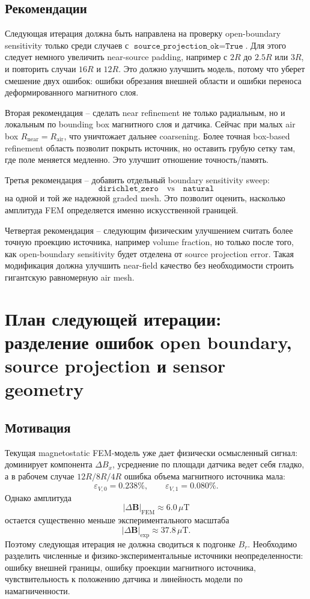 \documentclass[12pt,a4paper]{article}
\begin{document}
\subsection*{Рекомендации}

Следующая итерация должна быть направлена на проверку open-boundary sensitivity
только среди случаев с \(\texttt{source\_projection\_ok}=\texttt{True}\). Для
этого следует немного увеличить near-source padding, например с \(2R\) до
\(2.5R\) или \(3R\), и повторить случаи \(16R\) и \(12R\). Это должно улучшить
модель, потому что уберет смешение двух ошибок: ошибки обрезания внешней
области и ошибки переноса деформированного магнитного слоя.

Вторая рекомендация -- сделать near refinement не только радиальным, но и
локальным по bounding box магнитного слоя и датчика. Сейчас при малых air box
\(R_{\mathrm{near}}=R_{\mathrm{air}}\), что уничтожает дальнее coarsening. Более
точная box-based refinement область позволит покрыть источник, но оставить
грубую сетку там, где поле меняется медленно. Это улучшит отношение
точность/память.

Третья рекомендация -- добавить отдельный boundary sensitivity sweep:
\[
    \texttt{dirichlet\_zero}
    \quad \text{vs} \quad
    \texttt{natural}
\]
на одной и той же надежной graded mesh. Это позволит оценить, насколько
амплитуда FEM определяется именно искусственной границей.

Четвертая рекомендация -- следующим физическим улучшением считать более точную
проекцию источника, например volume fraction, но только после того, как
open-boundary sensitivity будет отделена от source projection error. Такая
модификация должна улучшить near-field качество без необходимости строить
гигантскую равномерную air mesh.

\section{План следующей итерации: разделение ошибок open boundary, source projection и sensor geometry}

\subsection*{Мотивация}

Текущая magnetostatic FEM-модель уже дает физически осмысленный сигнал:
доминирует компонента \(\Delta B_x\), усреднение по площади датчика ведет себя
гладко, а в рабочем случае \(12R/8R/4R\) ошибка объема магнитного источника
мала:
\[
    \varepsilon_{V,0}=0.238\%,
    \qquad
    \varepsilon_{V,1}=0.080\%.
\]
Однако амплитуда
\[
    |\Delta \mathbf B|_{\mathrm{FEM}}\approx 6.0\,\mu\mathrm{T}
\]
остается существенно меньше экспериментального масштаба
\[
    |\Delta \mathbf B|_{\mathrm{exp}}\approx 37.8\,\mu\mathrm{T}.
\]
Поэтому следующая итерация не должна сводиться к подгонке \(B_r\). Необходимо
разделить численные и физико-экспериментальные источники неопределенности:
ошибку внешней границы, ошибку проекции магнитного источника, чувствительность
к положению датчика и линейность модели по намагниченности.
\end{document}
